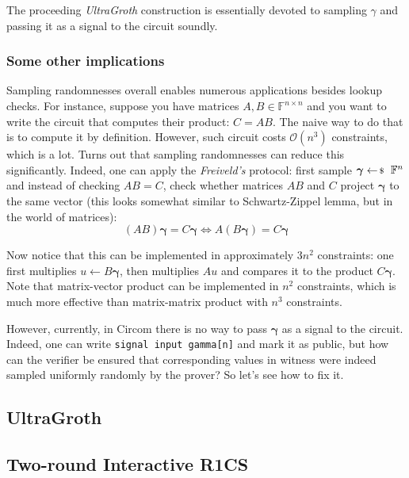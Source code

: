 The proceeding \textit{UltraGroth} construction is essentially devoted to
sampling $\gamma$ and passing it as a signal to the circuit soundly.

\subsubsection{Some other implications}

Sampling randomnesses overall enables numerous applications besides lookup
checks. For instance, suppose you have matrices $A,B \in \mathbb{F}^{n \times
n}$ and you want to write the circuit that computes their product: $C=AB$. The
naive way to do that is to compute it by definition. However, such circuit costs
$\mathcal{O}(n^3)$ constraints, which is a lot. Turns out that sampling
randomnesses can reduce this significantly. Indeed, one can apply the
\textit{Freiveld's} protocol: first sample $\boldsymbol{\gamma} \leftarrowS \mathbb{F}^n$ and
instead of checking $AB=C$, check whether matrices $AB$ and $C$ project $\boldsymbol{\gamma}$
to the same vector (this looks somewhat similar to Schwartz-Zippel lemma, but in
the world of matrices):
\[
(AB)\boldsymbol{\gamma} = C\boldsymbol{\gamma} \iff A(B\boldsymbol{\gamma}) = C\boldsymbol{\gamma}
\]

Now notice that this can be implemented in approximately $3n^2$ constraints: one
first multiplies $u \gets B\boldsymbol{\gamma}$, then multiplies $Au$ and compares it to the
product $C\boldsymbol{\gamma}$. Note that matrix-vector product can be implemented in $n^2$
constraints, which is much more effective than matrix-matrix product with $n^3$
constraints.

However, currently, in Circom there is no way to pass $\boldsymbol{\gamma}$ as a signal to
the circuit. Indeed, one can write \texttt{signal input gamma[n]} and mark it as
public, but how can the verifier be ensured that corresponding values in witness
were indeed sampled uniformly randomly by the prover? So let's see how to fix
it.

\subsection{UltraGroth}

\subsection{Two-round Interactive R1CS}

